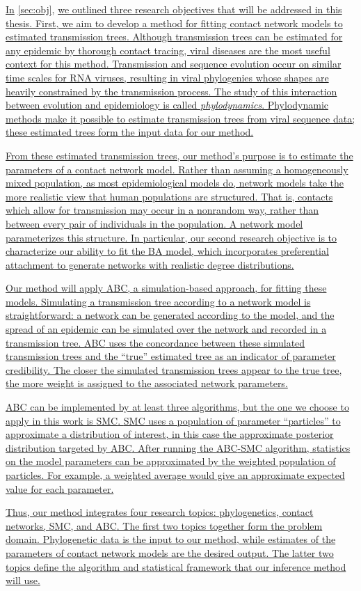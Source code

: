 {\color{blue}\uline{In} \cref{sec:obj}, \uline{we outlined three research
objectives that will be addressed in this thesis. First, we aim to develop a
method for fitting contact network models to estimated transmission trees.
Although transmission trees can be estimated for any epidemic by thorough
contact tracing, viral diseases are the most useful context for this method.
Transmission and sequence evolution occur on similar time scales for RNA
viruses, resulting in viral phylogenies whose shapes are heavily constrained by
the transmission process. The study of this interaction between evolution and
epidemiology is called \emph{phylodynamics}. Phylodynamic methods make it
possible to estimate transmission trees from viral sequence data; these
estimated trees form the input data for our method.}

\uline{From these estimated transmission trees, our method's purpose is to
estimate the parameters of a contact network model. Rather than assuming a
homogeneously mixed population, as most epidemiological models do, network
models take the more realistic view that human populations are structured. That
is, contacts which allow for transmission may occur in a nonrandom way, rather
than between every pair of individuals in the population. A network model
parameterizes this structure. In particular, our second research objective is
to characterize our ability to fit the \gls{BA} model, which incorporates
preferential attachment to generate networks with realistic degree
distributions.}

\uline{Our method will apply \gls{ABC}, a simulation-based approach, for
fitting these models. Simulating a transmission tree according to a network
model is straightforward: a network can be generated according to the model,
and the spread of an epidemic can be simulated over the network and recorded in
a transmission tree. \gls{ABC} uses the concordance between these simulated
transmission trees and the ``true'' estimated tree as an indicator of parameter
credibility. The closer the simulated transmission trees appear to the true
tree, the more weight is assigned to the associated network parameters.}

\uline{\gls{ABC} can be implemented by at least three algorithms, but the one
we choose to apply in this work is \gls{SMC}. \Gls{SMC} uses a population of
parameter ``particles'' to approximate a distribution of interest, in this case
the approximate posterior distribution targeted by \gls{ABC}. After running the
\gls{ABC}-\gls{SMC} algorithm, statistics on the model parameters can be
approximated by the weighted population of particles. For example, a weighted
average would give an approximate expected value for each parameter.}

\uline{Thus, our method integrates four research topics: phylogenetics, contact
networks, \acrlong{SMC}, and \acrlong{ABC}. The first two topics together form
the problem domain. Phylogenetic data is the input to our method, while
estimates of the parameters of contact network models are the desired output.
The latter two topics define the algorithm and statistical framework that our
inference method will use. }}
